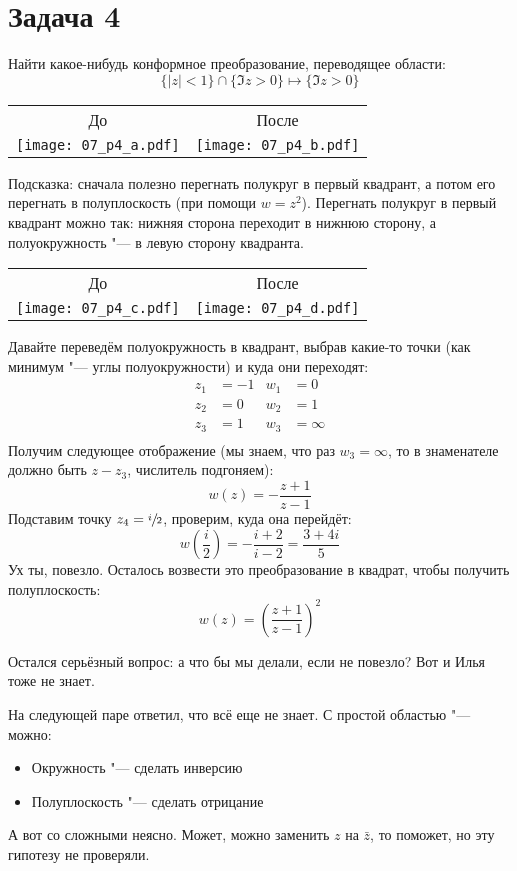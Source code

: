 \section{Задача 4}
	Найти какое-нибудь конформное преобразование, переводящее области:
	\[ \{ |z|<1 \} \cap \{\Im z > 0\} \mapsto \{ \Im z > 0 \} \]
	\begin{center}
		\begin{tabular}{cc}
		До & После \\
		\texttt{[image: 07\_p4\_a.pdf]} & \texttt{[image: 07\_p4\_b.pdf]} \\
		\end{tabular}
	\end{center}

	Подсказка: сначала полезно перегнать полукруг в первый квадрант, а потом его перегнать в полуплоскость
	(при помощи $w=z^2$).
	Перегнать полукруг в первый квадрант можно так: нижняя сторона переходит в нижнюю сторону,
	а полуокружность "--- в левую сторону квадранта.
	\begin{center}
		\begin{tabular}{cc}
		До & После \\
		\texttt{[image: 07\_p4\_c.pdf]} & \texttt{[image: 07\_p4\_d.pdf]} \\
		\end{tabular}
	\end{center}

	Давайте переведём полуокружность в квадрант, выбрав какие-то точки (как минимум "--- углы полуокружности)
	и куда они переходят:
	\begin{align*}
		z_1 &= -1 & w_1 &= 0 \\
		z_2 &= 0 & w_2 &= 1 \\
		z_3 &= 1 & w_3 &= \infty \\
	\end{align*}
	Получим следующее отображение (мы знаем, что раз $w_3=\infty$,
	то в знаменателе должно быть $z-z_3$, числитель подгоняем):
	\[ w(z)=-\frac{z+1}{z-1} \]
	Подставим точку $z_4=\sfrac i2$, проверим, куда она перейдёт:
	\[ w(\frac i2) = -\frac{i+2}{i-2} = \frac{3+4i}{5} \]
	Ух ты, повезло.
	Осталось возвести это преобразование в квадрат, чтобы получить полуплоскость:
	\[ w(z) = \left(\frac{z+1}{z-1}\right)^2 \]
	\begin{Rem}
		Остался серьёзный вопрос: а что бы мы делали, если не повезло?
		Вот и Илья тоже не знает.

		На следующей паре ответил, что всё еще не знает.
		С простой областью "--- можно:
		\begin{itemize}
			\item Окружность "--- сделать инверсию
			\item Полуплоскость "--- сделать отрицание
		\end{itemize}
		А вот со сложными неясно.
		Может, можно заменить $z$ на $\bar z$, то поможет, но эту гипотезу не проверяли.
	\end{Rem}

